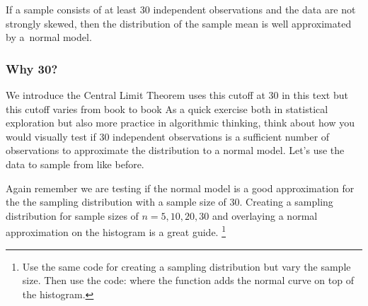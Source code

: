 \begin{termBox}{
If a sample consists of at least 30 independent observations and the data are not strongly skewed, then the distribution of the sample mean is well approximated by a~normal model.}
\end{termBox}

\subsubsection{Why 30?}
\label{why30}

We introduce the Central Limit Theorem uses this cutoff at 30 in this text but this cutoff varies from book to book  As a quick exercise both in statistical exploration but also more practice in algorithmic thinking, think about how you would visually test if 30 independent observations is a sufficient number of observations to approximate the distribution to a normal model. Let's use the  data to sample from like before. 

Again remember we are testing if the normal model is a good approximation for the the sampling distribution with a sample size of 30. Creating a sampling distribution for sample sizes of $n=5,10,20,30$ and overlaying a normal approximation on the histogram is a great guide. \footnote{Use the same code for creating a sampling distribution but vary the sample size. Then use the code: 
 where the function  adds the normal curve on top of the histogram.}

